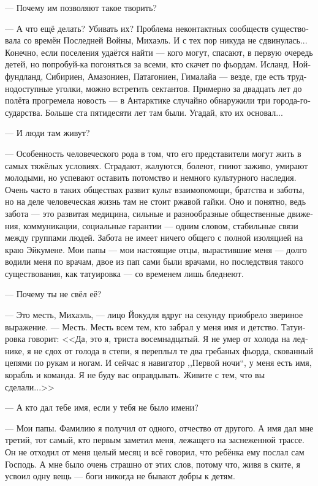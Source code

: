 \documentclass[a4paper,10pt,fleqn]{book}\usepackage{polyglossia}\setdefaultlanguage[babelshorthands=true]{russian}\setotherlanguage{english}\defaultfontfeatures{Ligatures=TeX,Mapping=tex-text}\usepackage{xcolor}\newcommand{\ml}[3]{#2}
\begin{document}
--- Почему им позволяют такое творить?

--- А что ещё делать?
Убивать их?
Проблема неконтактных сообществ существовала со времён Последней Войны, Михаэль.
И с тех пор никуда не сдвинулась...
Конечно, если поселения удаётся найти --- кого могут, спасают, в первую очередь детей, но попробуй-ка погоняться за всеми, кто скачет по фьордам.
Исланд, Нойфундланд, Сибириен, Амазониен, Патагониен, Гималайа --- везде, где есть труднодоступные уголки, можно встретить сектантов.
Примерно за двадцать лет до полёта прогремела новость --- в Антарктике случайно обнаружили три города-государства.
Больше ста пятидесяти лет там были.
Угадай, кто их основал...

--- И люди там живут?

--- Особенность человеческого рода в том, что его представители могут жить в самых тяжёлых условиях.
Страдают, жалуются, болеют, гниют заживо, умирают молодыми, но успевают оставить потомство и немного культурного наследия.
Очень часто в таких обществах развит культ взаимопомощи, братства и заботы, но на деле человеческая жизнь там не стоит ржавой гайки.
Оно и понятно, ведь забота --- это развитая медицина, сильные и разнообразные общественные движения, коммуникации, социальные гарантии --- одним словом, стабильные связи между группами людей.
Забота не имеет ничего общего с полной изоляцией на краю Эйкумене.
Мои папы --- мои настоящие отцы, вырастившие меня --- долго водили меня по врачам, двое из пап сами были врачами, но последствия такого существования, как татуировка --- со временем лишь бледнеют.

--- Почему ты не свёл её?

--- Это месть, Михаэль, --- лицо Йокудля вдруг на секунду приобрело звериное выражение.
--- Месть.
Месть всем тем, кто забрал у меня имя и детство.
Татуировка говорит: <<Да, это я, триста восемнадцатый.
\ml{$0$}
{Я не умер от холода на леднике, я не сдох от голода в степи, я переплыл те два гребаных фьорда, скованный цепями по рукам и ногам.}
{I haven't frozen dead on the glacier, I haven't died of starvation on the grassland, I have crossed those two fucking fjorde with chains on my limbs.}
И сейчас я навигатор ,,Первой ночи``, у меня есть имя, корабль и команда.
Я не буду вас оправдывать.
Живите с тем, что вы сделали...>>

--- А кто дал тебе имя, если у тебя не было имени?

--- Мои папы.
Фамилию я получил от одного, отчество от другого.
А имя дал мне третий, тот самый, кто первым заметил меня, лежащего на заснеженной трассе.
Он не отходил от меня целый месяц и всё говорил, что ребёнка ему послал сам Господь.
А мне было очень страшно от этих слов, потому что, живя в ските, я усвоил одну вещь --- боги никогда не бывают добры к детям.
\end{document}
